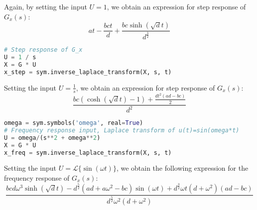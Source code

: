 \documentclass[a4paper,10pt,reqno]{amsart}
\numberwithin{equation}{section}
\newcommand{\lap}{\mathscr{L}}
\begin{document}
Again, by setting the input $U=1$, we obtain an expression for step response of $G_x(s)$:
\begin{equation}
    a t - \frac{b c t}{d} + \frac{b c \sinh{\left(\sqrt{d} t \right)}}{d^{\frac{3}{2}}}
\end{equation}
\begin{lstlisting}[language=python]
# Step response of G_x
U = 1 / s
X = G * U
x_step = sym.inverse_laplace_transform(X, s, t)
\end{lstlisting}
Setting the input $U=\frac{1}{s}$, we obtain an expression for step response of $G_x(s)$:
\begin{equation}
    \frac{b c \left(\cosh{\left(\sqrt{d} t \right)} - 1\right) + \frac{d t^{2} \left(a d - b c\right)}{2}}{d^{2}}
\end{equation}
\begin{lstlisting}[language=python]
omega = sym.symbols('omega', real=True)
# Frequency response input, Laplace transform of u(t)=sin(omega*t)
U = omega/(s**2 + omega**2)
X = G * U
x_freq = sym.inverse_laplace_transform(X, s, t)
\end{lstlisting}
Setting the input $U=\lap \{ \sin(\omega t) \}$, we obtain the following expression for the frequency response of $G_x(s)$:
\begin{equation}
    \frac{b c d \omega^{3} \sinh{\left(\sqrt{d} t \right)} - d^{\frac{5}{2}} \left(a d + a \omega^{2} - b c\right) \sin{\left(\omega t \right)} + d^{\frac{3}{2}} \omega t \left(d + \omega^{2}\right) \left(a d - b c\right)}{d^{\frac{5}{2}} \omega^{2} \left(d + \omega^{2}\right)}
\end{equation}
\end{document}
